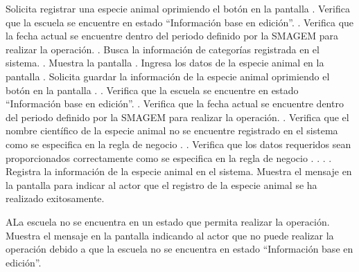  \begin{UCtrayectoria}
    \UCpaso[\UCactor] Solicita registrar una especie animal oprimiendo el botón  en la pantalla .
    \UCpaso[\UCsist] Verifica que la escuela se encuentre en estado ``Información base en edición''. .
    \UCpaso[\UCsist] Verifica que la fecha actual se encuentre dentro del periodo definido por la SMAGEM para realizar la operación. .
    \UCpaso[\UCsist] Busca la información de categorías registrada en el sistema. .
    \UCpaso[\UCsist] Muestra la pantalla .
    \UCpaso[\UCactor] Ingresa los datos de la especie animal en la pantalla . \label{cuibb4:Registrar}
    \UCpaso[\UCactor] Solicita guardar la información de la especie animal oprimiendo el botón  en la pantalla . .    
    \UCpaso[\UCsist] Verifica que la escuela se encuentre en estado ``Información base en edición''. .
    \UCpaso[\UCsist] Verifica que la fecha actual se encuentre dentro del periodo definido por la SMAGEM para realizar la operación. .
    \UCpaso[\UCsist] Verifica que el nombre científico de la especie animal no se encuentre registrado en el sistema como se especifica en la regla de negocio . .
    \UCpaso[\UCsist] Verifica que los datos requeridos sean proporcionados correctamente como se especifica en la regla de negocio . . . .
    \UCpaso[\UCsist] Registra la información de la especie animal en el sistema.
    \UCpaso[\UCsist] Muestra el mensaje  en la pantalla  para indicar al actor que el registro de la especie animal se ha realizado exitosamente.     
 \end{UCtrayectoria}
 
   \begin{UCtrayectoriaA}{A}{La escuela no se encuentra en un estado que permita realizar la operación.}
    \UCpaso[\UCsist] Muestra el mensaje  en la pantalla  indicando al actor que no puede realizar la operación debido a que la escuela no se encuentra en estado ``Información base en edición''. 
 \end{UCtrayectoriaA}

